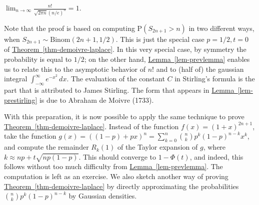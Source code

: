 \begin{cor}
$\lim_{n\to\infty} \frac{n!}{\sqrt{2\pi n}
(n/e)^n}=1$.
\end{cor}

\noindent Note that the proof is based on computing
$\mathrm{P}(S_{2n+1} > n)$ in two different ways,
when $S_{2n+1}\sim \textrm{Binom}(2n+1,1/2)$. This is
just the special case $p=1/2, t=0$ of \texorpdfstring{\hyperref[thm-demoivre-laplace]{Theorem~\ref*{thm-demoivre-laplace}}}{Theorem}. In this very special case, by
symmetry the probability is equal to $1/2$; on the
other hand, \hyperref[lem-prevlemma]{Lemma~\ref*{lem-prevlemma}} enables us to relate
this to the asymptotic behavior of $n!$ and to (half
of) the gaussian integral
$\int_{-\infty}^\infty e^{-x^2}\,dx$. The evaluation
of the constant $C$ in Stirling's formula is the part
that is attributed to James Stirling. The form that
appears in \hyperref[lem-prestirling]{Lemma~\ref*{lem-prestirling}} is due to Abraham
de Moivre (1733).

With this preparation, it is now possible to apply
the same technique to prove \texorpdfstring{\hyperref[thm-demoivre-laplace]{Theorem~\ref*{thm-demoivre-laplace}}}{Theorem}. Instead of the function
$f(x)=(1+x)^{2n+1}$, take the function
$g(x)=((1-p) + p x)^n=\sum_{k=0}^n \binom{n}{k} p^k
(1-p)^{n-k} x^k$,
and compute the remainder $R_k(1)$ of the Taylor
expansion of $g$, where
$k \approx np + t \sqrt{np(1-p)}$. This should
converge to $1-\Phi(t)$, and indeed, this follows
without too much difficulty from \texorpdfstring{\hyperref[lem-prevlemma]{Lemma~\ref*{lem-prevlemma}}}{Lemma}. The computation is left as an
exercise. We also sketch another way of proving
\hyperref[thm-demoivre-laplace]{Theorem~\ref*{thm-demoivre-laplace}} by directly
approximating the probabilities
$\binom{n}{k} p^k (1-p)^{n-k}$ by Gaussian densities.

